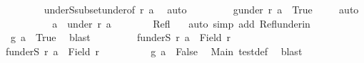 \begin{isabellebody}
\ \ \ \ \ \ \isamarkupfalse%
\ {\isacharasterisk}{\kern0pt}{\isacharasterisk}{\kern0pt}\ underS{\isacharunderscore}{\kern0pt}subset{\isacharunderscore}{\kern0pt}under{\isacharbrackleft}{\kern0pt}of\ r\ a{\isacharbrackright}{\kern0pt}\ \isamarkupfalse%
\ auto\isanewline
\ \ \ \ \ \ \isamarkupfalse%
\ {}{}{\isacharcolon}{\kern0pt}\ {\isachardoublequoteopen}g{\isacharbackquote}{\kern0pt}{\isacharparenleft}{\kern0pt}under\ r\ a{\isacharparenright}{\kern0pt}\ {\isasymle}\ {\isacharbraceleft}{\kern0pt}True{\isacharbraceright}{\kern0pt}{\isachardoublequoteclose}\ \isamarkupfalse%
\ {\isacharasterisk}{\kern0pt}{\isacharasterisk}{\kern0pt}\ \isamarkupfalse%
\ auto\isanewline
\ \ \ \ \ \ \isamarkupfalse%
\ \isamarkupfalse%
\ {}{}{\isacharcolon}{\kern0pt}\ {\isachardoublequoteopen}a\ {\isasymin}\ under\ r\ a{\isachardoublequoteclose}\isanewline
\ \ \ \ \ \ \isamarkupfalse%
\ Refl\ {\isacharasterisk}{\kern0pt}\ \isamarkupfalse%
\ {\isacharparenleft}{\kern0pt}auto\ simp\ add{\isacharcolon}{\kern0pt}\ Refl{\isacharunderscore}{\kern0pt}under{\isacharunderscore}{\kern0pt}in{\isacharparenright}{\kern0pt}\isanewline
\ \ \ \ \ \ \isamarkupfalse%
\ \isamarkupfalse%
\ {}{}{\isacharcolon}{\kern0pt}\ {\isachardoublequoteopen}g\ a\ {\isacharequal}{\kern0pt}\ True{\isachardoublequoteclose}\ \isamarkupfalse%
\ blast\isanewline
\ \ \ \ \ \ \isamarkupfalse%
\ {}{\isacharcolon}{\kern0pt}\ {\isachardoublequoteopen}f{\isacharbackquote}{\kern0pt}{\isacharparenleft}{\kern0pt}underS\ r\ a{\isacharparenright}{\kern0pt}\ {\isasymnoteq}\ Field\ r{\isacharprime}{\kern0pt}{\isachardoublequoteclose}\isanewline
\ \ \ \ \ \ \isamarkupfalse%
\isanewline
\ \ \ \ \ \ \ \ \isamarkupfalse%
\ {\isachardoublequoteopen}f{\isacharbackquote}{\kern0pt}{\isacharparenleft}{\kern0pt}underS\ r\ a{\isacharparenright}{\kern0pt}\ {\isacharequal}{\kern0pt}\ Field\ r{\isacharprime}{\kern0pt}{\isachardoublequoteclose}\isanewline
\ \ \ \ \ \ \ \ \isamarkupfalse%
\ {\isachardoublequoteopen}g\ a\ {\isacharequal}{\kern0pt}\ False{\isachardoublequoteclose}\ \isamarkupfalse%
\ Main{}\ test{\isacharunderscore}{\kern0pt}def\ \isamarkupfalse%
\ blast\isanewline
\ \ \ \ \ \ \ \ \isamarkupfalse%
\ {}{}\ \isamarkupfalse%

\end{isabellebody}
